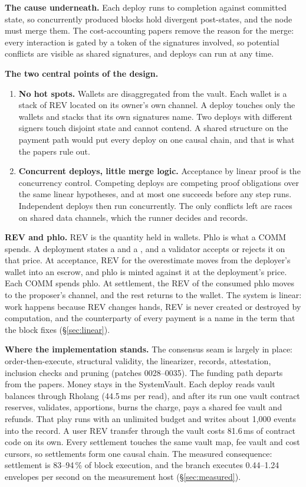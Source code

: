 \documentclass[11pt]{article}
\newcommand{\code}{\path}
\begin{document}
\textbf{The cause underneath.} Each deploy runs to completion against committed state, so concurrently produced blocks hold divergent post-states, and the node must merge them. The cost-accounting papers remove the reason for the merge: every interaction is gated by a token of the signatures involved, so potential conflicts are visible as shared signatures, and deploys can run at any time.

\textbf{The two central points of the design.}
\begin{enumerate}
\item \textbf{No hot spots.} Wallets are disaggregated from the vault. Each wallet is a stack of REV located on its owner's own channel. A deploy touches only the wallets and stacks that its own signatures name. Two deploys with different signers touch disjoint state and cannot contend. A shared structure on the payment path would put every deploy on one causal chain, and that is what the papers rule out.
\item \textbf{Concurrent deploys, little merge logic.} Acceptance by linear proof is the concurrency control. Competing deploys are competing proof obligations over the same linear hypotheses, and at most one succeeds before any step runs. Independent deploys then run concurrently. The only conflicts left are races on shared data channels, which the runner decides and records.
\end{enumerate}

\textbf{REV and phlo.} REV is the quantity held in wallets. Phlo is what a COMM spends. A deployment states a \code{phloLimit} and a \code{phloPrice}, and a validator accepts or rejects it on that price. At acceptance, REV for the overestimate moves from the deployer's wallet into an escrow, and phlo is minted against it at the deployment's price. Each COMM spends phlo. At settlement, the REV of the consumed phlo moves to the proposer's channel, and the rest returns to the wallet. The system is linear: work happens because REV changes hands, REV is never created or destroyed by computation, and the counterparty of every payment is a name in the term that the block fixes (\S\ref{sec:linear}).

\textbf{Where the implementation stands.} The consensus seam is largely in place: order-then-execute, structural validity, the linearizer, records, attestation, inclusion checks and pruning (patches 0028--0035). The funding path departs from the papers. Money stays in the SystemVault. Each deploy reads vault balances through Rholang (44.5\,ms per read), and after its run one vault contract reserves, validates, apportions, burns the charge, pays a shared fee vault and refunds. That play runs with an unlimited budget and writes about 1{,}000 events into the record. A user REV transfer through the vault costs 81.6\,ms of contract code on its own. Every settlement touches the same vault map, fee vault and cost cursors, so settlements form one causal chain. The measured consequence: settlement is 83--94\,\% of block execution, and the branch executes 0.44--1.24 envelopes per second on the measurement host (\S\ref{sec:measured}).
\end{document}
